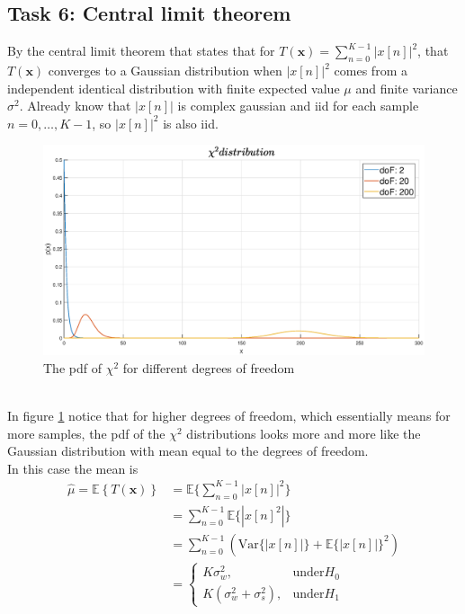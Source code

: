 \subsection{Task 6: Central limit theorem}
By the central limit theorem that states that for $T(\mathbf{x}) = \sum_{n=0}^{K-1}|x[n]|^2$, that $T(\mathbf{x})$ converges to a Gaussian distribution when $|x[n]|^2$ comes from a independent identical distribution with finite expected value $\mu$ and finite variance $\sigma^2$. Already know that $|x[n]|$ is complex gaussian and iid for each sample $n = 0, \dots, K-1$, so $|x[n]|^2$ is also iid.
\begin{figure}
    \centering
    \includegraphics[width=\textwidth]{figures/chi_square.eps}
    \caption{The pdf of $\chi^2$ for different degrees of freedom}
    \label{fig:chitogauss}
\end{figure}\\
In figure \ref{fig:chitogauss} notice that for higher degrees of freedom, which essentially means for more samples, the pdf of the $\chi^2$ distributions looks more and more like the Gaussian distribution with mean equal to the degrees of freedom.\\
In this case the mean is
\begin{align}
    \hat{\mu} = \mathbb{E}\left\{T(\mathbf{x})\right\} & = \mathbb{E}\{\sum_{n=0}^{K-1}|x[n]|^2\}\nonumber\\
    & = \sum_{n=0}^{K-1}\mathbb{E}\{|x[n]^2|\}\nonumber\\
    & = \sum_{n=0}^{K-1}(\text{Var}\{|x[n]|\}+\mathbb{E}\{|x[n]|\}^2)\nonumber\\
    & = \begin{cases}
    K\sigma_w^2, & \text{under} H_0\\
    K(\sigma_w^2+\sigma_s^2), & \text{under} H_1
    \end{cases}
\end{align}
